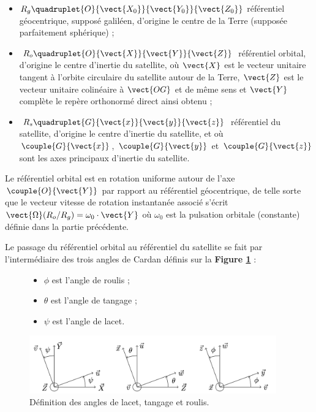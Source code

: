 \begin{itemize}
\item $R_g\quadruplet{O}{\vect{X_0}}{\vect{Y_0}}{\vect{Z_0}}$ référentiel géocentrique, supposé galiléen, d'origine le centre de la Terre (supposée parfaitement sphérique) ;
\item $R_o\quadruplet{O}{\vect{X}}{\vect{Y}}{\vect{Z}}$ référentiel orbital, d'origine le centre d'inertie du satellite, où $\vect{X}$ est le vecteur unitaire tangent à l'orbite circulaire du satellite autour de la Terre, $\vect{Z}$ est le vecteur unitaire colinéaire à $\vect{OG}$ et de même sens et $\vect{Y}$ complète le repère orthonormé direct ainsi obtenu ;
\item $R_s\quadruplet{G}{\vect{x}}{\vect{y}}{\vect{z}}$ référentiel du satellite, d'origine le centre d'inertie du satellite, et où $\couple{G}{\vect{x}}$, $\couple{G}{\vect{y}}$ et $\couple{G}{\vect{z}}$ sont les axes principaux d'inertie du satellite.
\end{itemize}

Le référentiel orbital est en rotation uniforme autour de l'axe $\couple{O}{\vect{Y}}$ par
rapport au référentiel géocentrique, de telle sorte que le vecteur
vitesse de rotation instantanée associé s'écrit $\vect{\Omega}(R_o/R_g)=\omega_0\cdot \vect{Y}$ où $\omega_0$ est la pulsation
orbitale (constante) définie dans la partie précédente.

Le passage du référentiel orbital au référentiel du satellite se fait
par l'intermédiaire des trois angles de Cardan définis sur la
\textbf{Figure \ref{fig4}} :

\begin{figure}[!htb]
\begin{minipage}[c]{0.3\textwidth}
\begin{itemize}
\item $\phi$ est l'angle de roulis ;
\item $\theta$ est l'angle de tangage ;
\item $\psi$ est l'angle de lacet.
\end{itemize}
\end{minipage}
\begin{minipage}[c]{0.7\textwidth}
\includegraphics[width=0.95\textwidth]{images/image4.jpg}
\end{minipage}
\caption{ Définition des angles de lacet, tangage et roulis. \label{fig4}}
\end{figure}

